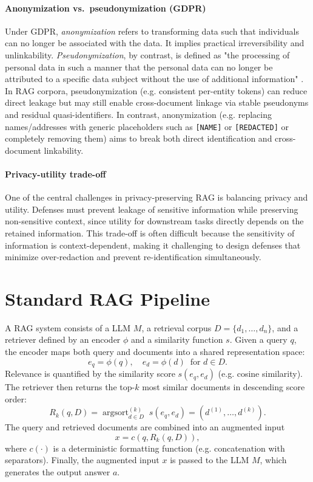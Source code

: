 \paragraph{Anonymization vs.\ pseudonymization (GDPR)}
Under GDPR, \textit{anonymization} refers to transforming data such that individuals can no longer be associated with the data. It implies practical irreversibility and unlinkability. \textit{Pseudonymization}, by contrast, is defined as "the processing of personal data in such a manner that the personal data can no longer be attributed to a specific data subject without the use of additional information" \cite{anonDefinition}. 
In \ac{RAG} corpora, pseudonymization (e.g. consistent per-entity tokens) can reduce direct leakage but may still enable cross-document linkage via stable pseudonyms and residual quasi-identifiers. In contrast, anonymization (e.g. replacing names/addresses with generic placeholders such as \texttt{[NAME]} or \texttt{[REDACTED]} or completely removing them) aims to break both direct identification and cross-document linkability.

\paragraph{Privacy-utility trade-off}
One of the central challenges in privacy-preserving \ac{RAG} is balancing privacy and utility. Defenses must prevent leakage of sensitive information while preserving non-sensitive context, since utility for downstream tasks directly depends on the retained information. This trade-off is often difficult because the sensitivity of information is context-dependent, making it challenging to design defenses that minimize over-redaction and prevent re-identification simultaneously.


\section{Standard RAG Pipeline}
A \ac{RAG} system consists of a \ac{LLM} $M$, a retrieval corpus $D=\{d_1,\dots,d_n\}$, and a retriever defined by an encoder $\phi$ and a similarity function $s$. 
Given a query $q$, the encoder maps both query and documents into a shared representation space:
\[
e_q = \phi(q), \quad e_d = \phi(d) \;\; \text{for } d \in D.
\]
Relevance is quantified by the similarity score $s(e_q,e_d)$ (e.g. cosine similarity). 
The retriever then returns the top-$k$ most similar documents in descending score order:
\[
R_k(q,D) = \operatorname{argsort}_{d \in D}^{(k)} \; s(e_q,e_d) = (d^{(1)}, \dots, d^{(k)}).
\]
The query and retrieved documents are combined into an augmented input
\[
x = c(q, R_k(q,D)),
\]
where $c(\cdot)$ is a deterministic formatting function (e.g. concatenation with separators).
Finally, the augmented input $x$ is passed to the LLM $M$, which generates the output answer $a$.


